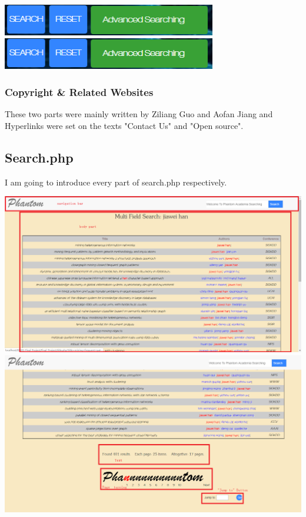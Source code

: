 \documentclass[10pt,twoside,a4paper,titlepage]{article}
\begin{document}
	\newline	
	\includegraphics[width=0.7\textwidth]{cyf/Advanced_searching30.png}
	\newline	
	\includegraphics[width=0.7\textwidth]{cyf/Advanced_searching31.png}
	
	\subsubsection{Copyright \& Related Websites}
	
	These two parts were mainly written by Ziliang Guo and Aofan Jiang and Hyperlinks were set on the texts "Contact Us" and "Open source".
	
	\subsection{Search.php}
	
	I am going to introduce every part of search.php respectively.
	\newline
	
	\includegraphics[width=1.0\textwidth]{cyf/SEARCH_struct1.png}
	\newline
	\includegraphics[width=1.0\textwidth]{cyf/SEARCH_2_struct2.png}
	
\end{document}
